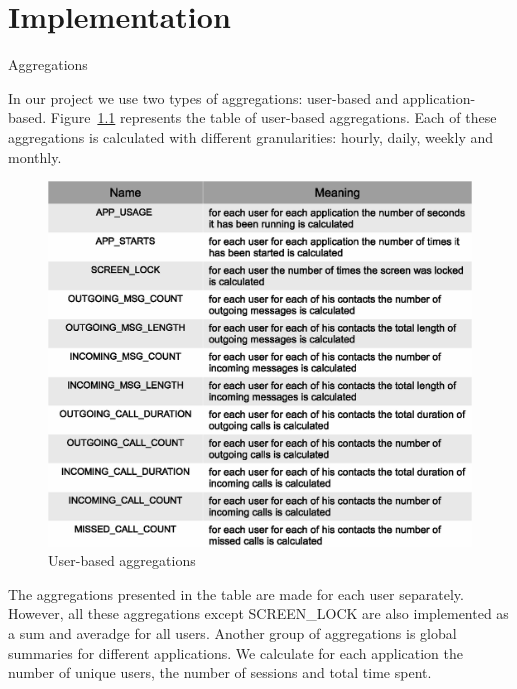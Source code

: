 \chapter{Implementation}
\label{chap:implementation}



Aggregations

In our project we use two types of aggregations: user-based and application-based.
Figure~\ref{fig:user_based_aggregations} represents the table of user-based aggregations.
Each of these aggregations is calculated with different granularities: hourly, daily, weekly and monthly.

\begin{figure}
  \centering
  \includegraphics [width=1.0\textwidth]{images/user_based_aggregations}
  \caption{User-based aggregations}
  \label{fig:user_based_aggregations}
\end{figure}

The aggregations presented in the table are made for each user separately.
However, all these aggregations except SCREEN\_LOCK are also implemented as a sum and averadge for all users. 
Another group of aggregations is global summaries for different applications.
We calculate for each application the number of unique users, the number of sessions and total time spent. 

